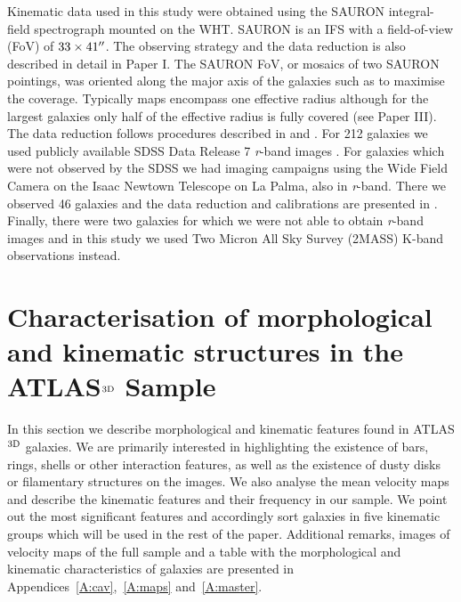 \documentclass[usenatbib,usegraphicx]{mn2e}
\begin{document}
Kinematic data used in this study were obtained using the SAURON integral-field spectrograph \citep[IFS;][]{2001MNRAS.326...23B} mounted on the WHT. SAURON is an IFS with a field-of-view (FoV) of $33 \times 41\hbox{$^{\prime\prime}$}$. The observing strategy and the data reduction is also described in detail in Paper I. The SAURON FoV, or mosaics of two SAURON pointings, was oriented along the major axis of the galaxies such as to maximise the coverage. Typically maps encompass one effective radius although for the largest galaxies only half of the effective radius is fully covered (see Paper III). The data reduction follows procedures described in \citet{2001MNRAS.326...23B} and \citet{2004MNRAS.352..721E}. For 212 galaxies we used publicly available SDSS Data Release 7 {\it r}-band images \citep{2009ApJS..182..543A}. For galaxies which were not observed by the SDSS we had imaging campaigns using the Wide Field Camera on the Isaac Newtown Telescope on La Palma, also in {\it r}-band. There we observed 46 galaxies and the data reduction and calibrations are presented in \citet{2011Scott}. Finally, there were two galaxies for which we were not able to obtain {\it r}-band images and in this study we used Two Micron All Sky Survey (2MASS) K-band observations instead. 


%
%

\section{Characterisation of morphological and kinematic structures in the ATLAS$^{\rm 3D}$ Sample}
\label{s:morph}

In this section we describe morphological and kinematic features found in ATLAS$^{\rm 3D}$ galaxies. We are primarily interested in highlighting the existence of bars, rings, shells or other interaction features, as well as the existence of dusty disks or filamentary structures on the images. We also analyse the mean velocity maps and describe the kinematic features and their frequency in our sample. We point out the most significant features and accordingly sort galaxies in five kinematic groups which will be used in the rest of the paper. Additional remarks, images of velocity maps of the full sample and a table with the morphological and kinematic characteristics of galaxies  are presented in Appendices~\ref{A:cav},~\ref{A:maps} and~\ref{A:master}. 
\end{document}
